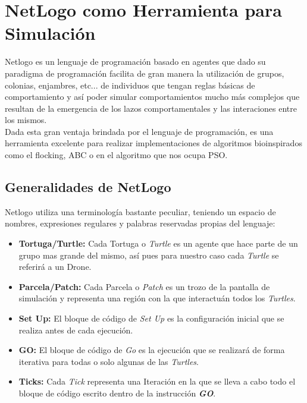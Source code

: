 \documentclass[journal]{IEEEtran}
\begin{document}
\section{NetLogo como Herramienta para Simulación}

Netlogo es un lenguaje de programación basado en agentes que dado su paradigma de programación facilita de gran manera la utilización de grupos, colonias, enjambres, etc... de individuos que tengan reglas básicas de comportamiento y así poder simular comportamientos mucho más complejos que resultan de la emergencia de los lazos comportamentales y las interaciones entre los mismos.\\
 
Dada esta gran ventaja brindada por el lenguaje de programación, es una herramienta excelente para realizar implementaciones de algoritmos bioinspirados como el flocking, ABC o en el algoritmo que nos ocupa PSO.\\

\subsection{Generalidades de NetLogo}
Netlogo utiliza una terminología bastante peculiar, teniendo un espacio de nombres, expresiones regulares y palabras reservadas propias del lenguaje:\\

\begin{itemize}
\item \textbf{Tortuga/Turtle: } Cada Tortuga o \textit{Turtle} es un agente que hace parte de un grupo mas grande del mismo, así pues para nuestro caso cada \textit{Turtle} se referirá a un Drone.
\item \textbf{Parcela/Patch: } Cada Parcela o \textit{Patch} es un trozo de la pantalla de simulación y representa una región con la que interactuán todos los \textit{Turtles}.
\item \textbf{Set Up: } El bloque de código de \textit{Set Up} es la configuración inicial que se realiza antes de cada ejecución.
\item \textbf{GO: } El bloque de código de \textit{Go} es la ejecución que se realizará de forma iterativa  para todas o solo algunas de las \textit{Turtles}.
\item \textbf{Ticks: } Cada \textit{Tick} representa una Iteración en la que se lleva a cabo todo el bloque de código escrito dentro de la instrucción \textbf{\textit{GO}}. 
\end{itemize}
\end{document}
